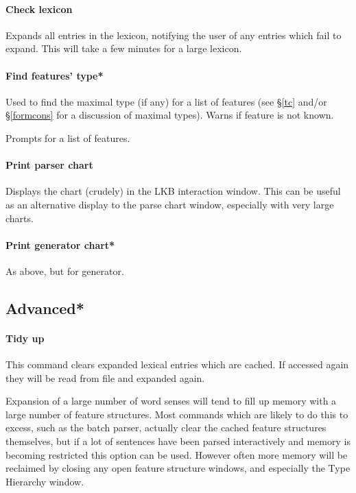 \documentclass[12pt]{report}
\begin{document}
\paragraph{Check lexicon} Expands all entries in the lexicon,
notifying the user of any entries which fail to expand.
This will take a few minutes for a large lexicon.

\paragraph{Find features' type*}  Used to find the maximal type (if any)
for a list of features (see \S\ref{tc} and/or \S\ref{formcons} 
for a discussion of maximal types).
Warns if feature is not known.

Prompts for a list of features.

\paragraph{Print parser chart}
Displays the chart (crudely) in the LKB interaction
window.  This can be useful as an alternative display to
the parse chart window, especially with very large charts.

\paragraph{Print generator chart*}
As above, but for generator.

\subsection{Advanced*}

\paragraph{Tidy up}
\label{tidy}
This command clears expanded lexical entries which are cached.  
If accessed again they will be read
from file and expanded again.

Expansion of a large number of word senses will tend to fill up memory
with a large number of feature structures.  Most commands which are
likely to do this to excess, such as the batch parser,
actually clear the cached feature structures
themselves, but if a lot of sentences have been parsed interactively and
memory is becoming restricted this option can be
used.  However often more memory will be reclaimed by closing any open
feature structure windows, and especially the Type Hierarchy window.
\end{document}
